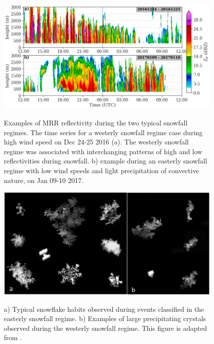 \documentclass{ametsocV5}
\providecommand{\DIFaddbeginFL}{} %
\providecommand{\DIFaddendFL}{} %
\providecommand{\DIFdelbeginFL}{} %
\providecommand{\DIFdelendFL}{} %
\newcommand{\DIFscaledelfig}{0.5}
\newlength{\DIFdelgraphicswidth} %
\newlength{\DIFdelgraphicsheight} %
\newcommand{\DIFaddincludegraphics}[2][]{{\color{blue}\fbox{\DIFOincludegraphics[#1]{#2}}}} %
\newcommand{\DIFdelincludegraphics}[2][]{%
\sbox{\DIFdelgraphicsbox}{\DIFOincludegraphics[#1]{#2}}%
\settoboxwidth{\DIFdelgraphicswidth}{\DIFdelgraphicsbox} %
\settoboxtotalheight{\DIFdelgraphicsheight}{\DIFdelgraphicsbox} %
\scalebox{\DIFscaledelfig}{%
\parbox[b]{\DIFdelgraphicswidth}{\usebox{\DIFdelgraphicsbox}\\[-\baselineskip] \rule{\DIFdelgraphicswidth}{0em}}\llap{\resizebox{\DIFdelgraphicswidth}{\DIFdelgraphicsheight}{%
\setlength{\unitlength}{\DIFdelgraphicswidth}%
\begin{picture}(1,1)%
\thicklines\linethickness{2pt} %
{\color[rgb]{1,0,0}\put(0,0){\framebox(1,1){}}}%
{\color[rgb]{1,0,0}\put(0,0){\line( 1,1){1}}}%
{\color[rgb]{1,0,0}\put(0,1){\line(1,-1){1}}}%
\end{picture}%
}\hspace*{3pt}}} %
} %
\DeclareRobustCommand{\DIFaddbeginFL}{\DIFOaddbeginFL \let\includegraphics\DIFaddincludegraphics} %
\DeclareRobustCommand{\DIFaddendFL}{\DIFOaddendFL \let\includegraphics\DIFOincludegraphics} %
\DeclareRobustCommand{\DIFdelbeginFL}{\DIFOdelbeginFL \let\includegraphics\DIFdelincludegraphics} %
\DeclareRobustCommand{\DIFdelendFL}{\DIFOaddendFL \let\includegraphics\DIFOincludegraphics} %
\begin{document}
\begin{figure}[t]
	\noindent\DIFdelbeginFL %
\DIFdelendFL \DIFaddbeginFL \includegraphics[width=\textwidth,angle=0]{fig4.png}\DIFaddendFL \\
	\caption{Examples of MRR reflectivity during the two typical snowfall regimes. The time series for a westerly snowfall regime case during high wind speed on Dec 24-25 2016 (a). The westerly snowfall regime was associated with interchanging patterns of high and low reflectivities during snowfall. b) example during an easterly snowfall regime with low wind speeds and light precipitation of convective nature, on Jan 09-10 2017.
	}
	\label{fig:MRR_refl}
\end{figure}

\begin{figure}
	\noindent\DIFdelbeginFL %
\DIFdelendFL \DIFaddbeginFL \includegraphics[width=\textwidth,angle=0]{fig5.jpg}\DIFaddendFL \\
	\caption{a) Typical snowflake habits observed during events classified in the easterly snowfall regime. b) Examples of large precipitating crystals observed during the westerly snowfall regime. This figure is adapted from \protect\citet{schirle_estimation_2019}.
	}
	\label{fig:snowflakes}
\end{figure}
\end{document}
